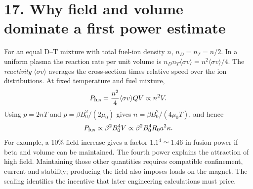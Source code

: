 \documentclass[11pt]{article}
\begin{document}
\section*{17. Why field and volume dominate a first power estimate}
For an equal D--T mixture with total fuel-ion density $n$, $n_D=n_T=n/2$. In a uniform
plasma the reaction rate per unit volume is
$n_Dn_T\langle\sigma v\rangle=n^2\langle\sigma v\rangle/4$.
The \emph{reactivity} $\langle\sigma v\rangle$ averages the cross-section times
relative speed over the ion distributions. At fixed temperature and fuel mixture,
\begin{equation}
 P_{\rm fus}=\frac{n^2}{4}\langle\sigma v\rangle QV\propto n^2V.
 \label{eq:pfus-density}
\end{equation}
Using $p=2nT$ and $p=\beta B_0^2/(2\mu_0)$ gives
$n=\beta B_0^2/(4\mu_0T)$, and hence
\begin{equation}
 P_{\rm fus}\propto\beta^2B_0^4V
 \propto\beta^2B_0^4R_0a^2\kappa.
 \label{eq:pfus-scaling}
\end{equation}
 For example, a 10\% field increase gives a
factor $1.1^4\simeq1.46$ in fusion power if beta and volume can be maintained.
The fourth power explains the attraction of high field. Maintaining those other
quantities requires compatible confinement, current and stability; producing the
field also imposes loads on the magnet. The scaling identifies the incentive that
later engineering calculations must price.
\end{document}
